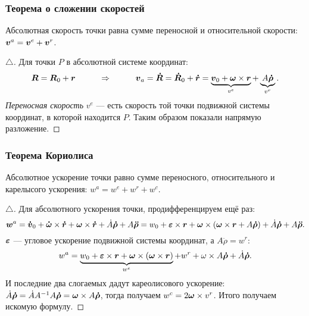 \subsubsection*{Теорема о сложении скоростей}
\begin{to_thr}
	Абсолютная скорость точки равна сумме переносной и относительной скорости: $\mbox{\boldmath $v$}^a = \mbox{\boldmath $v$}^e + \mbox{\boldmath $v$}^r$.
\end{to_thr}
\begin{proof}[$\triangle$]
	Для точки $P$ в абсолютной системе координат:
	\begin{equation*}
		\mbox{\boldmath $R$} = \mbox{\boldmath $R$}_0 + \mbox{\boldmath $r$}
		\hspace*{1 cm}
		\Rightarrow
		\hspace*{1 cm}
		\mbox{\boldmath $v$}_a = \mbox{\boldmath $\dot{R}$} = \mbox{\boldmath $\dot{R}$}_0 + \mbox{\boldmath $\dot{r}$} = \underbrace{\mbox{\boldmath $v$}_0 + \mbox{\boldmath $\omega$}\times \mbox{\boldmath $r$}}_{v^e} + \underbrace{A \mbox{\boldmath $\dot{\rho}$}}_{v^r}.
	\end{equation*}
	\textit{Переносная скорость} $v^e$ --- есть скорость той точки подвижной системы координат, в которой находится $P$.
	Таким образом показали напрямую разложение.
\end{proof}

\subsubsection*{Теорема Кориолиса}
\begin{to_thr}
	Абсолютное ускорение точки равно сумме переносного, относительного и карелысого ускорения: $w^a = w^e + w^r + w^c$.
\end{to_thr}
\begin{proof}[$\triangle$]
	Для абсолютного ускорения точки, продифференцируем ещё раз:
	\begin{equation*}
		\mbox{\boldmath $w$}^a = \mbox{\boldmath $\dot{v}$}_0 + \mbox{\boldmath $\dot{\omega}$} \times \mbox{\boldmath $\dot{r}$} + \mbox{\boldmath $\omega$} \times \mbox{\boldmath $\dot{r}$} + \dot{A} \mbox{\boldmath $\dot{\rho}$} + A \mbox{\boldmath $\ddot{\rho}$} = w_0 + \mbox{\boldmath $\varepsilon$} \times \mbox{\boldmath $r$} + \mbox{\boldmath $\omega$} \times (\mbox{\boldmath $\omega$} \times \mbox{\boldmath $r$} + A \mbox{\boldmath $\dot{\rho}$}) + \dot{A} \mbox{\boldmath $\dot{\rho}$} + A \mbox{\boldmath $\ddot{\rho}$}.
	\end{equation*}
	$\mbox{\boldmath $\varepsilon$}$ --- угловое ускорение подвижной системы координат, а $A \ddot{\rho} = w^r$:
	\begin{equation*}
		w^a = \underbrace{ w_0 + \mbox{\boldmath $\varepsilon$} \times \mbox{\boldmath $r$} + \mbox{\boldmath $\omega$} \times (\mbox{\boldmath $\omega$} \times \mbox{\boldmath $r$})}_{w^e} + w^r + \omega \times A \mbox{\boldmath $\dot{\rho}$} + \dot{A} \mbox{\boldmath $\dot{\rho}$}.
	\end{equation*}
	И последние два слогаемых дадут кареолисового ускорение: $\dot{A} \mbox{\boldmath $\dot{\rho}$} = \dot{A} A^{-1} A \mbox{\boldmath $\dot{\rho}$} = \mbox{\boldmath $\omega$} \times A \mbox{\boldmath $\dot{\rho}$} $, тогда получаем $w^c = 2 \mbox{\boldmath $\omega$} \times v^r$. Итого получаем искомую формулу.
\end{proof}
